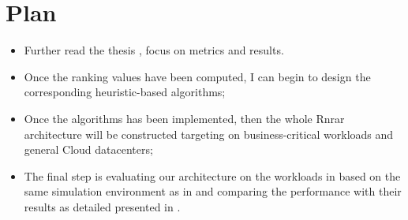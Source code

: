 \documentclass[10pt,conference,compsocconf]{IEEEtran}
\begin{document}
\section{Plan}
\begin{itemize}
  \item Further read the thesis \cite{van2015design}, focus on metrics and results.   
  \item Once the ranking values have been computed, I can begin to design the corresponding heuristic-based algorithms;
  \item Once the algorithms has been implemented, then the whole Rnrar architecture will be constructed targeting on business-critical workloads and general Cloud datacenters;
  \item The final step is evaluating our architecture on the workloads in \cite{shen2015statistical} based on the same simulation environment as in \cite{van2015self} and comparing the performance with their results as detailed presented in \cite{van2015design}.
\end{itemize}




\end{document}
